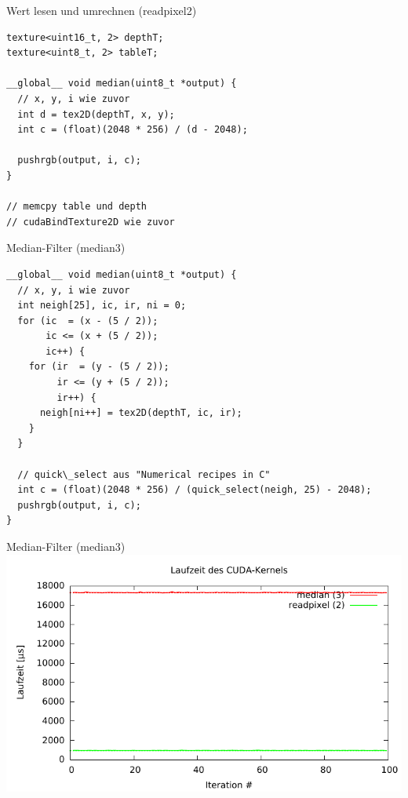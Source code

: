 \documentclass[compress]{beamer}
\begin{document}
\begin{frame}[fragile]{Wert lesen und umrechnen (readpixel2)}
\begin{lstlisting}
texture<uint16_t, 2> depthT;
texture<uint8_t, 2> tableT;

__global__ void median(uint8_t *output) {
  // x, y, i wie zuvor
  int d = tex2D(depthT, x, y);
  int c = (float)(2048 * 256) / (d - 2048);

  pushrgb(output, i, c);
}

// memcpy table und depth
// cudaBindTexture2D wie zuvor
\end{lstlisting}
\end{frame}

\begin{frame}[fragile]{Median-Filter (median3)}
\begin{lstlisting}
__global__ void median(uint8_t *output) {
  // x, y, i wie zuvor
  int neigh[25], ic, ir, ni = 0;
  for (ic  = (x - (5 / 2));
       ic <= (x + (5 / 2));
       ic++) {
    for (ir  = (y - (5 / 2));
         ir <= (y + (5 / 2));
         ir++) {
      neigh[ni++] = tex2D(depthT, ic, ir);
    }
  }

  // quick\_select aus "Numerical recipes in C"
  int c = (float)(2048 * 256) / (quick_select(neigh, 25) - 2048);
  pushrgb(output, i, c);
}
\end{lstlisting}
\end{frame}

\begin{frame}[fragile]{Median-Filter (median3)}
\includegraphics[width=\textwidth]{median3.pdf}
\end{frame}
\end{document}
